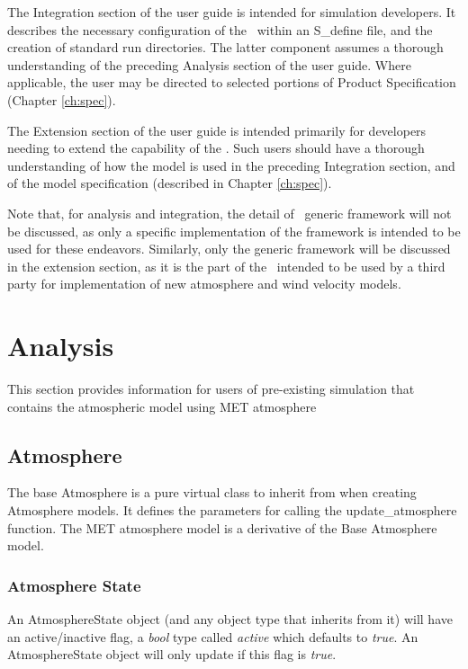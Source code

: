 The Integration section of the user guide is intended for simulation developers.
It describes the necessary configuration of the \atmosphereDesc\ within an
S\_define file, and the creation of standard run directories.  The latter
component assumes a thorough understanding of the preceding Analysis section of the user guide.
Where applicable, the user may be directed to selected portions of Product Specification (Chapter \ref{ch:spec}).

The Extension section of the user guide is intended primarily for developers
needing to extend the capability of the \atmosphereDesc.  Such users should have a
thorough understanding of how the model is used in the preceding
Integration section, and of the model
specification (described in Chapter \ref{ch:spec}).

Note that, for analysis and integration, the detail of \atmosphereDesc\ generic framework
will not be discussed, as only a specific implementation of the framework
is intended to be used for these endeavors. Similarly, only the generic framework
will be discussed in the extension section, as it is the part of the
\atmosphereDesc\ intended to be used by a third party for implementation of
new atmosphere and wind velocity models.

\section{Analysis}

This section provides information for users of pre-existing simulation that contains
the atmospheric model using MET atmosphere

\subsection{Atmosphere}
The base Atmosphere is a pure virtual class to inherit from when creating
Atmosphere models. It defines the parameters for calling the update\_atmosphere
function. The MET atmosphere model is a derivative of the Base Atmosphere model.

\subsubsection{Atmosphere State}
An AtmosphereState object (and any object type that inherits from it) will have
an active/inactive flag, a \textit{bool} type called \textit{active} which
defaults to \textit{true}.
An AtmosphereState object will only update if this flag is \textit{true}.

